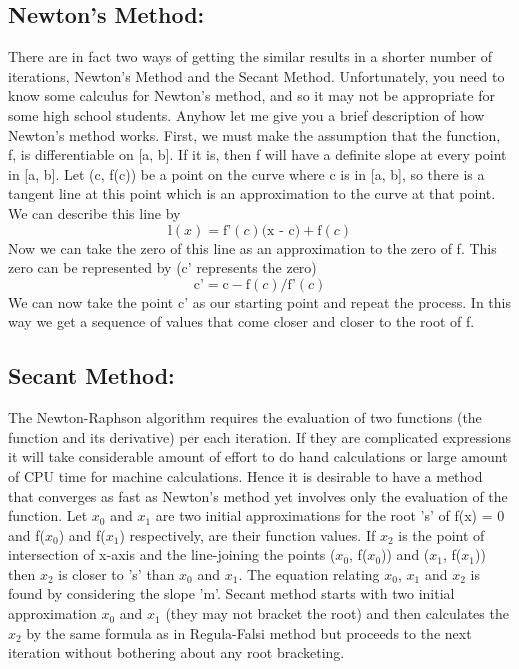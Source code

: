 \documentclass[12pt,a4paper]{article}
\begin{document}
\subsection{Newton's Method:}
There are in fact two ways of getting the similar results in a shorter number of iterations, Newton's Method and the Secant Method. Unfortunately, you need to know some calculus for Newton's method, and so it may not be appropriate for some high school students. Anyhow let me give you a brief description of how Newton's method works. First, we must make the assumption that the function, f, is differentiable on [a, b]. If it is, then f will have a definite slope at every point in [a, b]. Let (c, f(c)) be a point on the curve where c is in [a, b], so there is a tangent line at this point which is an approximation to the curve at that point. We can describe this line by
\begin{equation}
	\text{l}(x) = \text{f'}(c) \text{(x - c)} + \text{f}(c)
\end{equation}
Now we can take the zero of this line as an approximation to the zero of f. This zero can be represented by (c' represents the zero)
\begin{equation}
	\text{c'} = \text{c} -  \text{f}(c)/\text{f'}(c)
\end{equation}
We can now take the point c' as our starting point and repeat the process. In this way we get a sequence of values that come closer and closer to the root of f.
\subsection{Secant Method:}
The Newton-Raphson algorithm requires the evaluation of two functions (the function and its derivative) per each iteration. If they are complicated expressions it will take considerable amount of effort to do hand calculations or large amount of CPU time for machine calculations. Hence it is desirable to have a method that converges as fast as Newton's method yet involves only the evaluation of the function. Let $x_0$ and $x_1$ are two initial approximations for the root 's' of f(x) = 0 and f($x_0$) and f($x_1$) respectively, are their function values. If $x_2$ is the point of intersection of x-axis and the line-joining the points ($x_0$, f($x_0$)) and ($x_1$, f($x_1$)) then $x_2$ is closer to 's' than $x_0$ and $x_1$. The equation relating $x_0$, $x_1$ and $x_2$ is found by considering the slope 'm'. Secant method starts with two initial approximation $x_0$ and $x_1$ (they may not bracket the root) and then calculates the $x_2$ by the same formula as in Regula-Falsi method but proceeds to the next iteration without bothering about any root bracketing.
\end{document}
